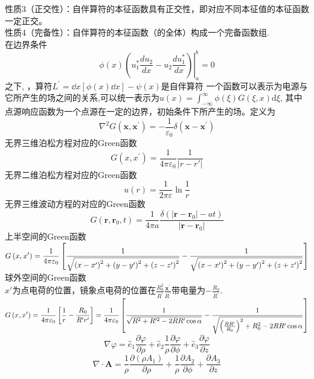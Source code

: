 \documentclass[UTF8,9pt]{ctexart}
\begin{document}
性质3（正交性）：自伴算符的本征函数具有正交性，即对应不同本征值的本征函数一定正交。\\
性质4（完备性）：自伴算符的本征函数（的全体）构成一个完备函数组.\\
在边界条件$$ 
\phi(x)\left.\left(u_{1}^{*} \frac{d u_{2}}{d x}-u_{2} \frac{d u_{1}^{*}}{d x}\right)\right|_{a} ^{b}=0
 $$之下, ，算符$L^{\prime}=\dd{}{x}\left[\phi(x) \dd{}{x}\right]-\psi(x)$是自伴算符
一个函数可以表示为电源与它所产生的场之间的关系,可以统一表示为$u(x)=\int_{-\infty}^{\infty} \phi(\xi) G(\xi, x) \mathrm{d} \xi$, 其中点源响应函数为一个点源在一定的边界，初始条件下所产生的场。定义为
$$ 
\nabla^{2} G\left(\boldsymbol{x}, \boldsymbol{x}^{\prime}\right)=-\frac{1}{\varepsilon_{0}} \delta\left(\boldsymbol{x}-\boldsymbol{x}^{\prime}\right)
$$
无界三维泊松方程对应的Green函数$$ 
G\left(x, x^{\prime}\right)=\frac{1}{4 \pi \varepsilon_{0}} \frac{1}{|r-r'|}
$$
无界二维泊松方程对应的Green函数$$ 
u(r)=\frac{1}{2 \pi \varepsilon} \ln \frac{1}{r}
$$
无界三维波动方程的对应的Green函数$$ 
G\left(\boldsymbol{r}, \boldsymbol{r}_{0}, t\right)=\frac{1}{4 \pi a} \frac{\delta\left(\left|\boldsymbol{r}-\boldsymbol{r}_{0}\right|-a t\right)}{\left|\boldsymbol{r}-\boldsymbol{r}_{0}\right|}
$$
上半空间的Green函数
\\$\displaystyle
G\left(x, x^{\prime}\right)= \frac{1}{4 \pi \varepsilon_{0}}\left[\frac{1}{\sqrt{\left(x-x^{\prime}\right)^{2}+\left(y-y^{\prime}\right)^{2}+\left(z-z^{\prime}\right)^{2}}}-\frac{1}{\sqrt{\left(x-x^{\prime}\right)^{2}+\left(y-y^{\prime}\right)^{2}+\left(z+z^{\prime}\right)^{2}}} \right] 
$\\
球外空间的Green函数\\
$x'$为点电荷的位置，镜象点电荷的位置在$\frac{R_{0}^{2}}{R^{\prime}} \frac{\boldsymbol{x}^{\prime}}{R^{\prime}}$带电量为$-\frac{R_{0}}{R^{\prime}}$.
\\$\displaystyle
G\left(x, x^{\prime}\right)=\frac{1}{4 \pi \varepsilon_{0}}\left[\frac{1}{r}-\frac{R_{0}}{R^{\prime} r^{\prime}}\right]=\frac{1}{4 \pi \varepsilon_{0}}\left[\frac{1}{\sqrt{R^{2}+R^{\prime 2}-2 R R^{\prime} \cos \alpha}} -\frac{1}{\sqrt{\left(\frac{R R^{\prime}}{R_{0}}\right)^{2}+R_{0}^{2}-2 R R^{\prime} \cos \alpha}} \right]
$\\
$$\nabla \varphi = \hat e_1 \frac { \partial \varphi } { \partial \rho } + \hat e_2 \frac { 1 } { \rho } \frac { \partial \varphi } { \partial \phi } + \hat { e } _ { 3 } \frac { \partial \varphi } { \partial z }$$
$$\nabla \cdot \bm{ A } = \frac { 1 } { \rho } \frac { \partial ( \rho A _ { 1 } ) } { \partial \rho } + \frac { 1 } { \rho } \frac { \partial A _ { 2 } } { \partial \phi } + \frac { \partial A _ { 3 } } { \partial z }$$
\end{document}
